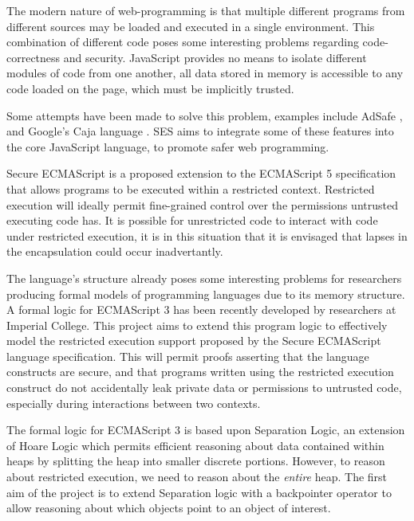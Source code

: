 \documentclass[a4paper]{report}
\begin{document}
  The modern nature of web-programming
  is that multiple different programs from different sources may be loaded and
  executed in a single environment. This combination of different code poses
  some interesting problems regarding code-correctness and security. JavaScript
  provides no means to isolate different modules of code from one another, all
  data stored in memory is accessible to any code loaded on the page, which must
  be implicitly trusted.

  Some attempts have been made to solve this problem, examples include AdSafe
  \cite{AdSafe}, and Google's Caja language \cite{miller2008caja}. SES aims to
  integrate some of these features into the core JavaScript language, to promote
  safer web programming.

  Secure ECMAScript is a proposed extension to the ECMAScript 5 specification
  that allows programs to be executed within a restricted context. Restricted
  execution will ideally permit fine-grained control over the permissions
  untrusted executing code has. It is possible for unrestricted code to interact
  with code under restricted execution, it is in this situation that it is
  envisaged that lapses in the encapsulation could occur inadvertantly.

  The language's structure already poses some interesting problems for
  researchers producing formal models of programming languages due to its memory
  structure.  A formal logic for ECMAScript 3 has been recently developed by
  researchers at Imperial College. This project aims to extend this program
  logic to effectively model the restricted execution support proposed by the
  Secure ECMAScript language specification. This will permit proofs asserting
  that the language constructs are secure, and that programs written using the
  restricted execution construct do not accidentally leak private data or
  permissions to untrusted code, especially during interactions between two
  contexts.

  The formal logic for ECMAScript 3 is based upon Separation Logic, an extension
  of Hoare Logic which permits efficient reasoning about data contained within
  heaps by splitting the heap into smaller discrete portions. However, to reason
  about restricted execution, we need to reason about the \emph{entire}
  heap. The first aim of the project is to extend Separation logic with a
  backpointer operator to allow reasoning about which objects point to an
  object of interest.
\end{document}
